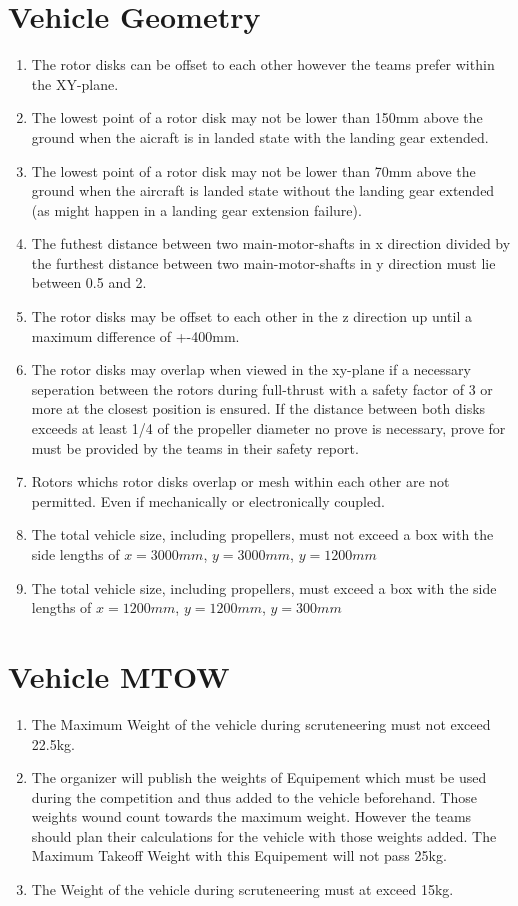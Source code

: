\documentclass{article}
\begin{document}
\section{Vehicle Geometry}
\begin{enumerate}
  \item The rotor disks can be offset to each other however the teams prefer within the XY-plane. 
  \item The lowest point of a rotor disk may not be lower than 150mm above the ground when the aicraft is in landed state with the landing gear extended.
  \item The lowest point of a rotor disk may not be lower than 70mm above the ground when the aircraft is landed state without the landing gear extended (as might happen in a landing gear extension failure).
  \item The futhest distance between two main-motor-shafts in x direction divided by the furthest distance between two main-motor-shafts in y direction must lie between 0.5 and 2. 
  \item The rotor disks may be offset to each other in the z direction up until a maximum difference of +-400mm.
  \item The rotor disks may overlap when viewed in the xy-plane if a necessary seperation between the rotors during full-thrust with a safety factor of 3 or more at the closest position is ensured. If the distance between both disks exceeds at least 1/4 of the propeller diameter no prove is necessary, prove for must be provided by the teams in their safety report. 
  \item Rotors whichs rotor disks overlap or mesh within each other are not permitted. Even if mechanically or electronically coupled.
  \item The total vehicle size, including propellers, must not exceed a box with the side lengths of $x=3000mm$, $y=3000mm$, $y=1200mm$
  \item The total vehicle size, including propellers, must exceed a box with the side lengths of $x=1200mm$, $y=1200mm$, $y=300mm$
\end{enumerate}

\section{Vehicle MTOW}
\begin{enumerate}
  \item The Maximum Weight of the vehicle during scruteneering must not exceed 22.5kg.
  \item The organizer will publish the weights of Equipement which must be used during the competition and thus added to the vehicle beforehand. Those weights wound count towards the maximum weight. 
  However the teams should plan their calculations for the vehicle with those weights added. The Maximum Takeoff Weight with this Equipement will not pass 25kg.  
  \item The Weight of the vehicle during scruteneering must at exceed 15kg.  
\end{enumerate}
\end{document}
